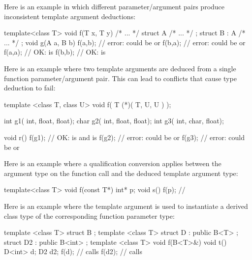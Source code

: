 \pnum
\enterexample
Here is an example in which different parameter/argument pairs produce
inconsistent template argument deductions:

\begin{codeblock}
template<class T> void f(T x, T y) { /* ... */ }
struct A { /* ... */ };
struct B : A { /* ... */ };
void g(A a, B b) {
  f(a,b);           // error:  could be  or 
  f(b,a);           // error:  could be  or 
  f(a,a);           // OK:  is 
  f(b,b);           // OK:  is 
}
\end{codeblock}

Here is an example where two template arguments are deduced from a
single function parameter/argument pair.
This can lead to conflicts
that cause type deduction to fail:

\begin{codeblock}
template <class T, class U> void f(  T (*)( T, U, U )  );

int g1( int, float, float);
char g2( int, float, float);
int g3( int, char, float);

void r() {
  f(g1);            // OK:  is  and  is 
  f(g2);            // error:  could be  or 
  f(g3);            // error:  could be  or 
}
\end{codeblock}

Here is an example where a qualification conversion applies between the
argument type on the function call and the deduced template argument type:

\begin{codeblock}
template<class T> void f(const T*) { }
int* p;
void s() {
  f(p);             // 
}
\end{codeblock}

Here is an example where the template argument is used to instantiate
a derived class type of the corresponding function parameter type:

\begin{codeblock}
template <class T> struct B { };
template <class T> struct D : public B<T> {};
struct D2 : public B<int> {};
template <class T> void f(B<T>&){}
void t() {
  D<int> d;
  D2     d2;
  f(d);             // calls 
  f(d2);            // calls 
}
\end{codeblock}
\exitexample

